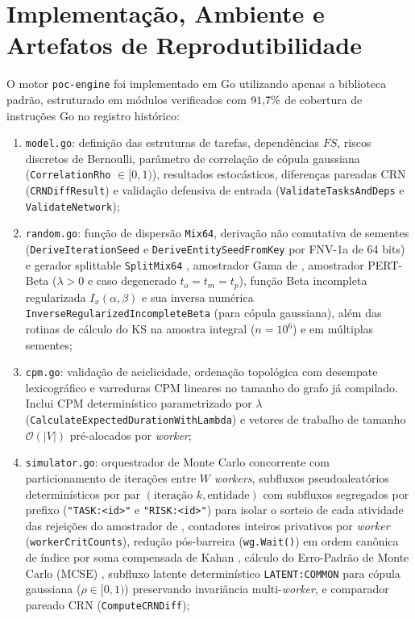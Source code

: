 \documentclass[12pt,openany,oneside,a4paper,english,brazilian,sumario=tradicional]{abntex2}
\begin{document}
\section{Implementação, Ambiente e Artefatos de Reprodutibilidade}\label{sec:poc_repro}

O motor \texttt{poc-engine} foi implementado em Go utilizando apenas a biblioteca padrão, estruturado em módulos verificados com $91{,}7{}\%$ de cobertura de instruções Go no registro histórico:
\begin{enumerate}
  \item \texttt{model.go}: definição das estruturas de tarefas, dependências $FS$, riscos discretos de Bernoulli, parâmetro de correlação de cópula gaussiana (\texttt{CorrelationRho} $\in [0, 1)$), resultados estocásticos, diferenças pareadas CRN (\texttt{CRNDiffResult}) e validação defensiva de entrada (\texttt{ValidateTasksAndDeps} e \texttt{ValidateNetwork});
  \item \texttt{random.go}: função de dispersão \texttt{Mix64}, derivação não comutativa de sementes (\texttt{DeriveIterationSeed} e \texttt{DeriveEntitySeedFromKey} por FNV-1a de 64 bits) e gerador splittable \texttt{SplitMix64} \cite{steele2014,lecuyer2017}, amostrador Gama de , amostrador PERT-Beta ($\lambda > 0$ e caso degenerado $t_o = t_m = t_p$), função Beta incompleta regularizada $I_x(\alpha,\beta)$ e sua inversa numérica \texttt{InverseRegularizedIncompleteBeta} (para cópula gaussiana), além das rotinas de cálculo do KS na amostra integral ($n=10^6$) e em múltiplas sementes;
  \item \texttt{cpm.go}: validação de aciclicidade, ordenação topológica com desempate lexicográfico e varreduras CPM lineares no tamanho do grafo já compilado. Inclui CPM determinístico parametrizado por $\lambda$ (\texttt{CalculateExpected}\allowbreak\texttt{DurationWithLambda}) e vetores de trabalho de tamanho $\mathcal{O}(|V|)$ pré-alocados por \textit{worker};
  \item \texttt{simulator.go}: orquestrador de Monte Carlo concorrente com particionamento de iterações entre $W$ \textit{workers}, subfluxos pseudoaleatórios determinísticos por par $(\text{iteração } k,\text{entidade})$ com subfluxos segregados por prefixo (\texttt{"TASK:<id>"} e \texttt{"RISK:<id>"}) para isolar o sorteio de cada atividade das rejeições do amostrador de , contadores inteiros privativos por \textit{worker} (\texttt{workerCritCounts}), redução pós-barreira (\texttt{wg.Wait()}) em ordem canônica de índice por soma compensada de Kahan \cite{kahan1965}, cálculo do Erro-Padrão de Monte Carlo ($\mathrm{MCSE}$) \cite{law2015}, subfluxo latente determinístico \texttt{LATENT:COMMON} para cópula gaussiana ($\rho \in [0, 1)$) preservando invariância multi-\textit{worker}, e comparador pareado CRN (\texttt{ComputeCRNDiff});

\end{enumerate}
\end{document}
